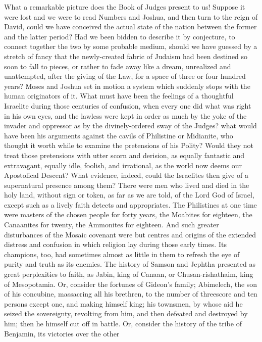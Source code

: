 What a remarkable picture does the Book of Judges present to us!
Suppose it were lost and we were to read Numbers and Joshua, and then
turn to the reign of David, could we have conceived the actual state
of the nation between the former and the latter period? Had we been
bidden to describe it by conjecture, to connect together the two by
some probable medium, should we have guessed by a stretch of fancy
that the newly-created fabric of Judaism had been destined so soon to
fall to pieces, or rather to fade away like a dream, unrealized and
unattempted, after the giving of the Law, for a space of three or four
hundred years? Moses and Joshua set in motion a system which suddenly
stops with the human originators of it. What must have been the
feelings of a thoughtful Israelite during those centuries of
confusion, when every one did what was right in his own eyes, and the
lawless were kept in order as much by the yoke of the invader and
oppressor as by the divinely-ordered sway of the Judges? what would
have been his arguments against the cavils of Philistine or Midianite,
who thought it worth while to examine the pretensions of his Polity?
Would they not treat those pretensions with utter scorn and derision,
as equally fantastic and extravagant, equally idle, foolish, and
irrational, as the world now deems our Apostolical Descent? What
evidence, indeed, could the Israelites then give of a supernatural
presence among them? There were men who lived and died in the holy
land, without sign or token, as far as we are told, of the Lord God of
Israel, except such as a lively faith detects and appropriates. The
Philistines at one time were masters of the chosen people for
forty years, the Moabites for eighteen, the Canaanites for twenty, the
Ammonites for eighteen. And such greater disturbances of the Mosaic
covenant were but centres and origins of the extended distress and
confusion in which religion lay during those early times. Its
champions, too, had sometimes almost as little in them to refresh the
eye of purity and truth as its enemies. The history of Samson and
Jephtha presented as great perplexities to faith, as Jabin, king of
Canaan, or Chusan-rishathaim, king of Mesopotamia. Or, consider the
fortunes of Gideon's family; Abimelech, the son of his concubine,
massacring all his brethren, to the number of threescore and ten
persons except one, and making himself king; his townsmen, by whose
aid he seized the sovereignty, revolting from him, and then defeated
and destroyed by him; then he himself cut off in battle. Or, consider
the history of the tribe of Benjamin, its victories over the other
